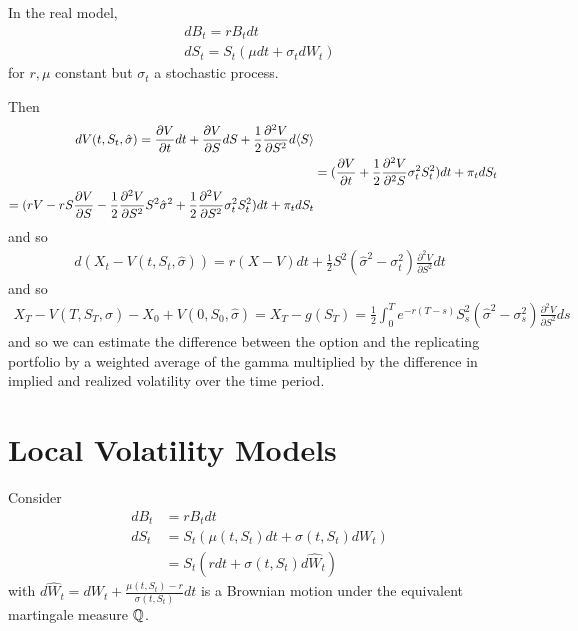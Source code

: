 In the real model,
\begin{align}
  \label{eq:98}
  dB_{t} = r B_{t} dt \\
  dS_{t} = S_{t} (\mu dt + \sigma_{t} dW_{t})
\end{align} for $r, \mu$ constant but $\sigma_{t}$ a stochastic process.

Then
\begin{align}
  \label{eq:99}
  dV(t, S_{t}, \hat \sigma) = \frac{\partial V}{\partial t} dt +
  \frac{\partial V}{\partial S} dS + \frac{1}{2} \frac{\partial^{2}
    V}{\partial S^{2}} d \IP{S} \\
  &= (\frac{\partial V}{\partial t} + \frac{1}{2} \frac{\partial^{2}
    V}{\partial^{2} S} \sigma^{2}_{t} S_{t}^{2}) dt + \pi_{t} dS_{t}
\\
= (rV - rS \frac{\partial V}{\partial S} - \frac{1}{2}
\frac{\partial^{2} V}{\partial S^{2}} S^{2} \hat \sigma^{2} +
\frac{1}{2} \frac{\partial^{2} V}{\partial S^{2}} \sigma^{2}_{t}
S^{2}_{t}) dt + \pi_{t} dS_{t}
\end{align} and so
\begin{align}
  \label{eq:100}
  d(X_{t} - V(t, S_{t}, \hat \sigma)) = r (X - V) dt + \frac{1}{2}
  S^{2} (\hat \sigma^{2} - \sigma^{2}_{t}) \frac{\partial^{2}
    V}{\partial S^{2}} dt
\end{align} and so
\begin{align}
  \label{eq:101}
  X_{T} - V(T, S_{T}, \hat \sigma) - X_{0} + V(0, S_{0}, \hat \sigma)
  = X_{T} - g(S_{T}) = \frac{1}{2}\int_{0}^{T} e^{-r(T-s)} S^{2}_{s}
  (\hat \sigma^{2} - \sigma_{s}^{2}) \frac{\partial^{2} V}{\partial
    S^{2}} ds
\end{align}
and so we can estimate the difference between the option and the
replicating portfolio by a weighted average of the gamma multiplied by
the difference in implied and realized volatility over the time period.


\chapter{Local Volatility Models}
\label{cha:local-volat-models}

Consider
\begin{align}
  \label{eq:102}
  dB_{t} &= r B_{t} dt \\
  dS_{t} &= S_{t} (\mu(t, S_{t}) dt + \sigma(t, S_{t}) dW_{t})  \\
  &= S_{t}(r dt + \sigma(t, S_{t}) d \hat W_{t})
\end{align} with $d \hat W_{t} = dW_{t} + \frac{\mu(t, S_{t}) -
  r}{\sigma(t, S_{t})} dt$ is a Brownian motion under the equivalent
martingale measure $\Q$.

